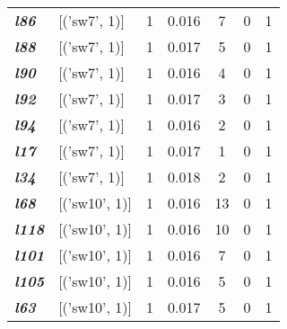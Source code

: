 \begin{table}
\begin{tabular}{llccccc}
    \textit{\textbf{l86}}                                            & {[}('sw7', 1){]}             & 1             & 0.016              & 7              & 0              & 1           \\
    \textit{\textbf{l88}}                                            & {[}('sw7', 1){]}             & 1             & 0.017              & 5              & 0              & 1           \\
    \textit{\textbf{l90}}                                            & {[}('sw7', 1){]}             & 1             & 0.016              & 4              & 0              & 1           \\
    \textit{\textbf{l92}}                                            & {[}('sw7', 1){]}             & 1             & 0.017              & 3              & 0              & 1           \\
    \textit{\textbf{l94}}                                            & {[}('sw7', 1){]}             & 1             & 0.016              & 2              & 0              & 1           \\
    \textit{\textbf{l17}}                                            & {[}('sw7', 1){]}             & 1             & 0.017              & 1              & 0              & 1           \\
    \textit{\textbf{l34}}                                            & {[}('sw7', 1){]}             & 1             & 0.018              & 2              & 0              & 1           \\
    \textit{\textbf{l68}}                                            & {[}('sw10', 1){]}            & 1             & 0.016              & 13             & 0              & 1           \\
    \textit{\textbf{l118}}                                           & {[}('sw10', 1){]}            & 1             & 0.016              & 10             & 0              & 1           \\
    \textit{\textbf{l101}}                                           & {[}('sw10', 1){]}            & 1             & 0.016              & 7              & 0              & 1           \\
    \textit{\textbf{l105}}                                           & {[}('sw10', 1){]}            & 1             & 0.016              & 5              & 0              & 1           \\
    \textit{\textbf{l63}}                                            & {[}('sw10', 1){]}            & 1             & 0.017              & 5              & 0              & 1           \\

\end{tabular}
\end{table}
